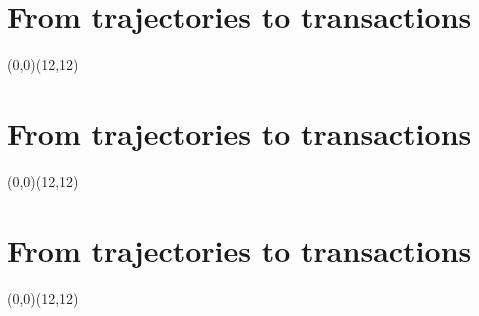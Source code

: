 \centering
\section*{From trajectories to transactions}
	\vspace{1cm}
	 {
	\begin{pspicture}(0,0)(12,12)
		
	\end{pspicture}
}
\clearpage
\section*{From trajectories to transactions}
	\vspace{1cm}
	 {
	\begin{pspicture}(0,0)(12,12)
		
		
	\end{pspicture}
}
\clearpage
\section*{From trajectories to transactions}
	\vspace{1cm}
	 {
	\begin{pspicture}(0,0)(12,12)
		
		
		
	\end{pspicture}
}
\clearpage
